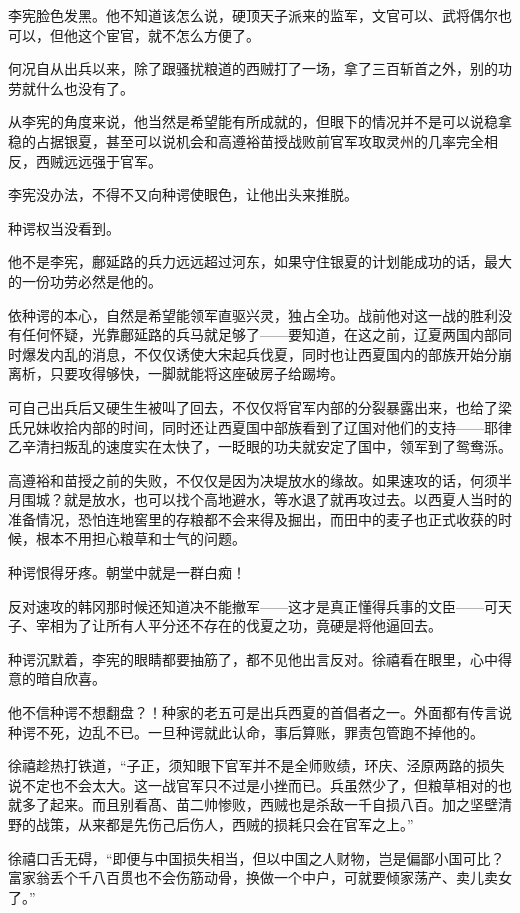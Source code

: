 李宪脸色发黑。他不知道该怎么说，硬顶天子派来的监军，文官可以、武将偶尔也可以，但他这个宦官，就不怎么方便了。

何况自从出兵以来，除了跟骚扰粮道的西贼打了一场，拿了三百斩首之外，别的功劳就什么也没有了。

从李宪的角度来说，他当然是希望能有所成就的，但眼下的情况并不是可以说稳拿稳的占据银夏，甚至可以说机会和高遵裕苗授战败前官军攻取灵州的几率完全相反，西贼远远强于官军。

李宪没办法，不得不又向种谔使眼色，让他出头来推脱。

种谔权当没看到。

他不是李宪，鄜延路的兵力远远超过河东，如果守住银夏的计划能成功的话，最大的一份功劳必然是他的。

依种谔的本心，自然是希望能领军直驱兴灵，独占全功。战前他对这一战的胜利没有任何怀疑，光靠鄜延路的兵马就足够了——要知道，在这之前，辽夏两国内部同时爆发内乱的消息，不仅仅诱使大宋起兵伐夏，同时也让西夏国内的部族开始分崩离析，只要攻得够快，一脚就能将这座破房子给踢垮。

可自己出兵后又硬生生被叫了回去，不仅仅将官军内部的分裂暴露出来，也给了梁氏兄妹收拾内部的时间，同时还让西夏国中部族看到了辽国对他们的支持——耶律乙辛清扫叛乱的速度实在太快了，一眨眼的功夫就安定了国中，领军到了鸳鸯泺。

高遵裕和苗授之前的失败，不仅仅是因为决堤放水的缘故。如果速攻的话，何须半月围城？就是放水，也可以找个高地避水，等水退了就再攻过去。以西夏人当时的准备情况，恐怕连地窖里的存粮都不会来得及掘出，而田中的麦子也正式收获的时候，根本不用担心粮草和士气的问题。

种谔恨得牙疼。朝堂中就是一群白痴！

反对速攻的韩冈那时候还知道决不能撤军——这才是真正懂得兵事的文臣——可天子、宰相为了让所有人平分还不存在的伐夏之功，竟硬是将他逼回去。

种谔沉默着，李宪的眼睛都要抽筋了，都不见他出言反对。徐禧看在眼里，心中得意的暗自欣喜。

他不信种谔不想翻盘？！种家的老五可是出兵西夏的首倡者之一。外面都有传言说种谔不死，边乱不已。一旦种谔就此认命，事后算账，罪责包管跑不掉他的。

徐禧趁热打铁道，“子正，须知眼下官军并不是全师败绩，环庆、泾原两路的损失说不定也不会太大。这一战官军只不过是小挫而已。兵虽然少了，但粮草相对的也就多了起来。而且别看髙、苗二帅惨败，西贼也是杀敌一千自损八百。加之坚壁清野的战策，从来都是先伤己后伤人，西贼的损耗只会在官军之上。”

徐禧口舌无碍，“即便与中国损失相当，但以中国之人财物，岂是偏鄙小国可比？富家翁丢个千八百贯也不会伤筋动骨，换做一个中户，可就要倾家荡产、卖儿卖女了。”

